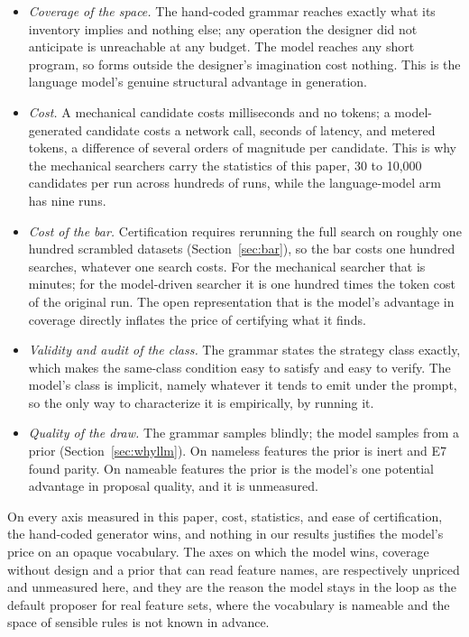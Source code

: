 \documentclass[11pt]{article}
\begin{document}
\begin{itemize}[leftmargin=1.4em]
\item \emph{Coverage of the space.} The hand-coded grammar reaches exactly what its inventory implies
and nothing else; any operation the designer did not anticipate is unreachable at any budget. The model
reaches any short program, so forms outside the designer's imagination cost nothing. This is the
language model's genuine structural advantage in generation.
\item \emph{Cost.} A mechanical candidate costs milliseconds and no tokens; a model-generated candidate
costs a network call, seconds of latency, and metered tokens, a difference of several orders of
magnitude per candidate. This is why the mechanical searchers carry the statistics of this paper, 30 to
10{,}000 candidates per run across hundreds of runs, while the language-model arm has nine runs.
\item \emph{Cost of the bar.} Certification requires rerunning the full search on roughly one hundred
scrambled datasets (Section~\ref{sec:bar}), so the bar costs one hundred searches, whatever one search
costs. For the mechanical searcher that is minutes; for the model-driven searcher it is one hundred
times the token cost of the original run. The open representation that is the model's advantage in
coverage directly inflates the price of certifying what it finds.
\item \emph{Validity and audit of the class.} The grammar states the strategy class exactly, which
makes the same-class condition easy to satisfy and easy to verify. The model's class is implicit,
namely whatever it tends to emit under the prompt, so the only way to characterize it is empirically,
by running it.
\item \emph{Quality of the draw.} The grammar samples blindly; the model samples from a prior
(Section~\ref{sec:whyllm}). On nameless features the prior is inert and E7 found parity. On nameable
features the prior is the model's one potential advantage in proposal quality, and it is unmeasured.
\end{itemize}

On every axis measured in this paper, cost, statistics, and ease of certification, the hand-coded
generator wins, and nothing in our results justifies the model's price on an opaque vocabulary. The
axes on which the model wins, coverage without design and a prior that can read feature names, are
respectively unpriced and unmeasured here, and they are the reason the model stays in the loop as the
default proposer for real feature sets, where the vocabulary is nameable and the space of sensible
rules is not known in advance.
\end{document}
